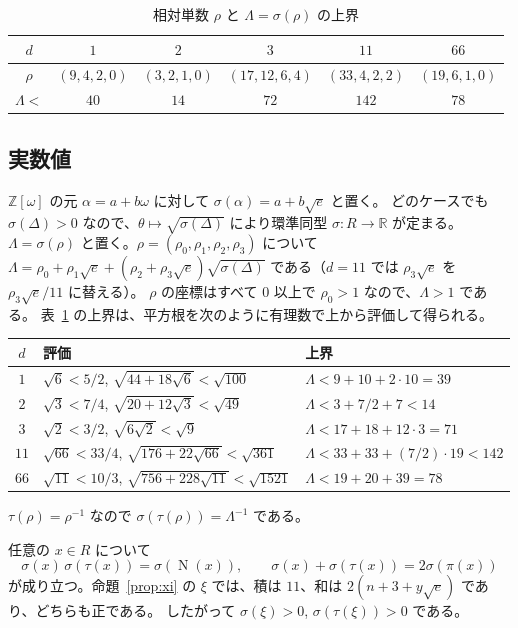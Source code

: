 \documentclass[a4paper,11pt]{ltjsarticle}
\theoremstyle{jplain}
\numberwithin{equation}{section}
\numberwithin{table}{section}
\newcommand{\Z}{\mathbb{Z}}
\newcommand{\Rr}{\mathbb{R}}
\newcommand{\Nm}{\operatorname{N}}
\begin{document}
\begin{table}[htbp]
\centering
\caption{相対単数 $\rho$ と $\Lambda=\sigma(\rho)$ の上界}\label{tab:rho}
\begin{tabular}{cccccc}
\toprule
$d$ & $1$ & $2$ & $3$ & $11$ & $66$\\
\midrule
$\rho$ & $(9,4,2,0)$ & $(3,2,1,0)$ & $(17,12,6,4)$ & $(33,4,2,2)$ & $(19,6,1,0)$\\
$\Lambda<$ & $40$ & $14$ & $72$ & $142$ & $78$\\
\bottomrule
\end{tabular}
\end{table}

\subsection{実数値}

$\Z[\omega]$ の元 $\alpha=a+b\omega$ に対して $\sigma(\alpha)=a+b\sqrt e$ と置く。
どのケースでも $\sigma(\Delta)>0$ なので、$\theta\mapsto\sqrt{\sigma(\Delta)}$ により環準同型 $\sigma:R\to\Rr$ が定まる。
$\Lambda=\sigma(\rho)$ と置く。$\rho=(\rho_0,\rho_1,\rho_2,\rho_3)$ について $\Lambda=\rho_0+\rho_1\sqrt e+(\rho_2+\rho_3\sqrt e)\sqrt{\sigma(\Delta)}$ である（$d=11$ では $\rho_3\sqrt e$ を $\rho_3\sqrt e/11$ に替える）。
$\rho$ の座標はすべて $0$ 以上で $\rho_0>1$ なので、$\Lambda>1$ である。
表~\ref{tab:rho} の上界は、平方根を次のように有理数で上から評価して得られる。
\begin{center}
\small
\begin{tabular}{cll}
\toprule
$d$ & 評価 & 上界\\
\midrule
$1$ & $\sqrt6<5/2$, $\sqrt{44+18\sqrt6}<\sqrt{100}$ & $\Lambda<9+10+2\cdot10=39$\\
$2$ & $\sqrt3<7/4$, $\sqrt{20+12\sqrt3}<\sqrt{49}$ & $\Lambda<3+7/2+7<14$\\
$3$ & $\sqrt2<3/2$, $\sqrt{6\sqrt2}<\sqrt9$ & $\Lambda<17+18+12\cdot3=71$\\
$11$ & $\sqrt{66}<33/4$, $\sqrt{176+22\sqrt{66}}<\sqrt{361}$ & $\Lambda<33+33+(7/2)\cdot19<142$\\
$66$ & $\sqrt{11}<10/3$, $\sqrt{756+228\sqrt{11}}<\sqrt{1521}$ & $\Lambda<19+20+39=78$\\
\bottomrule
\end{tabular}
\end{center}
$\tau(\rho)=\rho^{-1}$ なので $\sigma(\tau(\rho))=\Lambda^{-1}$ である。

任意の $x\in R$ について
\[
\sigma(x)\,\sigma(\tau(x))=\sigma(\Nm(x)),\qquad\sigma(x)+\sigma(\tau(x))=2\sigma(\pi(x))
\]
が成り立つ。命題~\ref{prop:xi} の $\xi$ では、積は $11$、和は $2(n+3+y\sqrt e)$ であり、どちらも正である。
したがって $\sigma(\xi)>0$, $\sigma(\tau(\xi))>0$ である。
\end{document}
